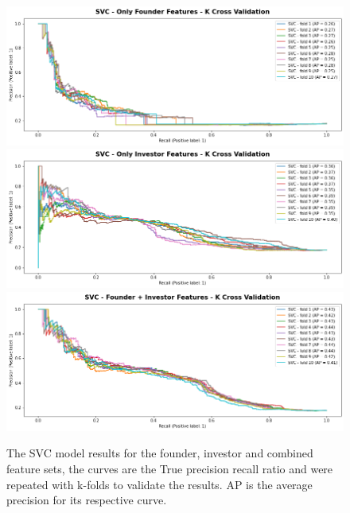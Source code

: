 \documentclass{article}
\begin{document}
\begin{figure}[h]
	\centering
	\includegraphics[width=\textwidth]{figures/svc_cfounder_kcross}
	\includegraphics[width=\textwidth]{figures/svc_investor_kcross}
	\includegraphics[width=\textwidth]{figures/svc_combined_kcross}
	\caption{The SVC model results for the founder, investor and combined feature sets, the curves are the True precision recall ratio and were repeated with k-folds to validate the results. AP is the average precision for its respective curve.}
	\label{fig:svc_model}
\end{figure}
\end{document}
